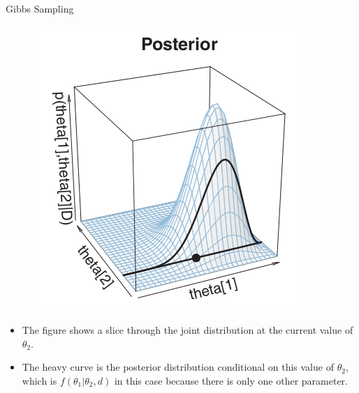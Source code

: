 \documentclass[handout]{beamer}
\begin{document}
\begin{frame}{Gibbs Sampling}
\scriptsize{


 \begin{figure}[h!]
	\centering
	\includegraphics[scale=0.4]{pics/gibbs1.png}
	\end{figure} 

\begin{itemize}

\item The figure shows a slice through the joint distribution at the current value of $\theta_2$. 

\item The heavy curve is the posterior distribution conditional on this value of $\theta_2$, which is $f(\theta_1|\theta_2 , d)$ in this case because there is only one other parameter.

\end{itemize}


} 
\end{frame}
\end{document}
